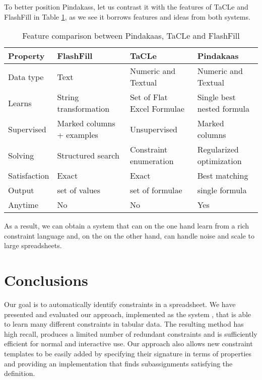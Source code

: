To better position Pindakass, let us contrast it with the features of
TaCLe and FlashFill in Table \ref{tab:pindakaas_features}, as we see it borrows features and ideas from both systems.
\begin{table}
  \begin{tabularx}{\textwidth}{l | X | X | X }
    \textbf{Property} & \textbf{FlashFill} & \textbf{TaCLe} &
    \textbf{Pindakaas} \\ \hline
    Data type & Text & Numeric and Textual &  Numeric and
    Textual\\\hline
    Learns & String transformation & Set of Flat Excel Formulae
    & Single best nested formula\\\hline
    Supervised & Marked columns + examples & Unsupervised &
    Marked columns \\\hline
    Solving & Structured search & Constraint enumeration &
    Regularized optimization \\\hline
    Satisfaction & Exact & Exact &  Best
    matching\\\hline
    Output & set of values & set of formulae & single
    formula\\ \hline
    Anytime & No & No & Yes
  \end{tabularx}
  \caption{Feature comparison between Pindakaas, TaCLe and FlashFill}
  \label{tab:pindakaas_features}
\end{table}

As a result, we can obtain a system that can on the one hand learn from a rich constraint language and, on the on the other hand, can handle noise and scale to large spreadsheets.


\section{Conclusions}\label{sec:tacle_conclusions}

Our goal is to automatically identify constraints in a spreadsheet.
We have presented and evaluated our approach, implemented as the system \sname, that is able to learn many different constraints in tabular data.
The resulting method has high recall, produces a limited number of redundant constraints and is sufficiently efficient for normal and interactive use.
Our approach also allows new constraint templates to be easily added by specifying their signature in terms of properties and providing an implementation that finds subassignments satisfying the definition.

